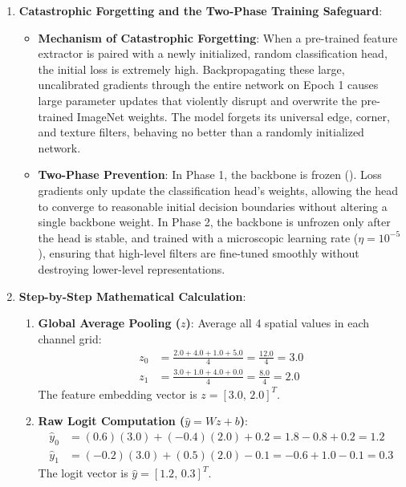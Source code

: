 \begin{enumerate}
    \item \textbf{Catastrophic Forgetting and the Two-Phase Training Safeguard}:
    \begin{itemize}
        \item \textbf{Mechanism of Catastrophic Forgetting}: When a pre-trained feature extractor is paired with a newly initialized, random classification head, the initial loss is extremely high. Backpropagating these large, uncalibrated gradients through the entire network on Epoch 1 causes large parameter updates that violently disrupt and overwrite the pre-trained ImageNet weights. The model forgets its universal edge, corner, and texture filters, behaving no better than a randomly initialized network.
        \item \textbf{Two-Phase Prevention}: In Phase 1, the backbone is frozen (). Loss gradients only update the classification head's weights, allowing the head to converge to reasonable initial decision boundaries without altering a single backbone weight. In Phase 2, the backbone is unfrozen only after the head is stable, and trained with a microscopic learning rate ($\eta = 10^{-5}$), ensuring that high-level filters are fine-tuned smoothly without destroying lower-level representations.
    \end{itemize}

    \item \textbf{Step-by-Step Mathematical Calculation}:
    \begin{enumerate}
        \item \textbf{Global Average Pooling ($z$)}:
        Average all 4 spatial values in each channel grid:
        \begin{align*}
        z_0 &= \frac{2.0 + 4.0 + 1.0 + 5.0}{4} = \frac{12.0}{4} = \mathbf{3.0} \\
        z_1 &= \frac{3.0 + 1.0 + 4.0 + 0.0}{4} = \frac{8.0}{4} = \mathbf{2.0}
        \end{align*}
        The feature embedding vector is $z = [3.0,\, 2.0]^T$.

        \item \textbf{Raw Logit Computation ($\hat{y} = W z + b$)}:
        \begin{align*}
        \hat{y}_0 &= (0.6)(3.0) + (-0.4)(2.0) + 0.2 = 1.8 - 0.8 + 0.2 = \mathbf{1.2} \\
        \hat{y}_1 &= (-0.2)(3.0) + (0.5)(2.0) - 0.1 = -0.6 + 1.0 - 0.1 = \mathbf{0.3}
        \end{align*}
        The logit vector is $\hat{y} = [1.2,\, 0.3]^T$.


\end{enumerate}
\end{enumerate}
